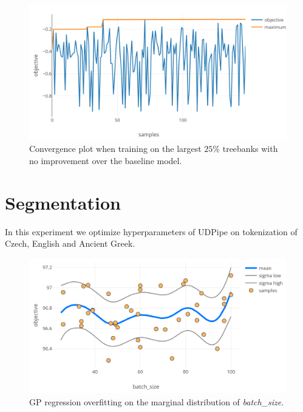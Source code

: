 \begin{figure}
	\begin{center}
		\includegraphics[width=1.0\textwidth]{images/sig-large-convergence.png}
		\caption{Convergence plot when training on the largest $25\%$ treebanks with no improvement over the baseline model.}
		\label{figure:sig-large-convergence}
	\end{center}
\end{figure}

\clearpage
\section{Segmentation}

In this experiment we optimize hyperparameters of UDPipe \citep{udpipe:2017} on tokenization of Czech, English and Ancient Greek.

\begin{figure}
	\begin{center}
		\includegraphics[width=1.0\textwidth]{images/tokenizer-overfitting-batch-size.png}
		\caption{GP regression overfitting on the marginal distribution of \emph{batch\_size}.}
		\label{figure:gp-overfitting-batch-size}
	\end{center}
\end{figure}

